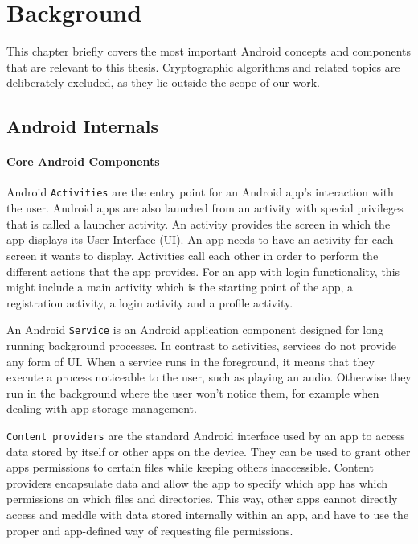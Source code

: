 \chapter{Background}
\label{c:background}

This chapter briefly covers the most important Android concepts and components that are relevant to this thesis. Cryptographic algorithms and related topics are deliberately excluded, as they lie outside the scope of our work.

\section{Android Internals}

\subsubsection{Core Android Components}
Android \texttt{Activities} \cite{android_concepts_activities} are the entry point for an Android app's interaction with the user. Android apps are also launched from an activity with special privileges that is called a launcher activity. An activity provides the screen in which the app displays its User Interface (UI). An app needs to have an activity for each screen it wants to display. Activities call each other in order to perform the different actions that the app provides. For an app with login functionality, this might include a main activity which is the starting point of the app, a registration activity, a login activity and a profile activity.

An Android \texttt{Service} \cite{android_concepts_services} is an Android application component designed for long running background processes. In contrast to activities, services do not provide any form of UI. When a service runs in the foreground, it means that they execute a process noticeable to the user, such as playing an audio. Otherwise they run in the background where the user won't notice them, for example when dealing with app storage management. 

\texttt{Content providers} \cite{android_concepts_content_providers} are the standard Android interface used by an app to access data stored by itself or other apps on the device. They can be used to grant other apps permissions to certain files while keeping others inaccessible. Content providers encapsulate data and allow the app to specify which app has which permissions on which files and directories. This way, other apps cannot directly access and meddle with data stored internally within an app, and have to use the proper and app-defined way of requesting file permissions. 

